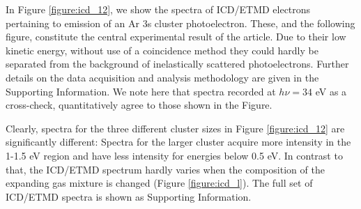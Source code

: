 %
In Figure \ref{figure:icd_12}, we show the spectra of ICD/ETMD electrons pertaining to emission of an Ar 3s cluster photoelectron. 
These, and the following figure, constitute the central experimental result of the article.
Due to their low kinetic energy, without use of a coincidence method they could hardly be separated from the background of inelastically scattered photoelectrons.\cite{mucke}
Further details on the data acquisition and analysis methodology are given in the Supporting Information.
We note here that spectra recorded at $h\nu = 34$ eV as a cross-check, quantitatively agree to those shown in the Figure.

Clearly, spectra for the three different cluster sizes in Figure \ref{figure:icd_12} are significantly different: Spectra for the larger cluster acquire more intensity in the 1-1.5 eV region and have less intensity for energies below 0.5 eV.
In contrast to that, the ICD/ETMD spectrum hardly varies when the composition of the expanding gas mixture is changed (Figure \ref{figure:icd_l}).
The full set of ICD/ETMD spectra is shown as Supporting Information.

